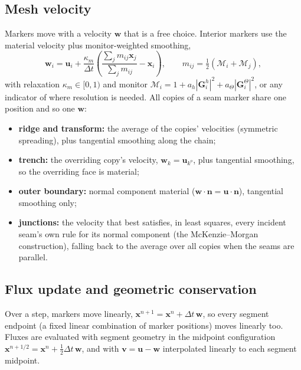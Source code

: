 \documentclass[11pt]{article}
\newcommand{\vect}[1]{\mathbf{#1}}
\begin{document}
\subsection{Mesh velocity}
Markers move with a velocity $\vect{w}$ that is a free choice. Interior markers use the material velocity plus monitor-weighted smoothing,
\begin{equation}
  \vect{w}_i=\vect{u}_i+\frac{\kappa_m}{\Delta t}\left(\frac{\sum_jm_{ij}\vect{x}_j}{\sum_jm_{ij}}-\vect{x}_i\right),\qquad m_{ij}=\tfrac12(\mathcal{M}_i+\mathcal{M}_j),
  \label{eq:meshvel}
\end{equation}
with relaxation $\kappa_m\in[0,1)$ and monitor $\mathcal{M}_i=1+a_h|\vect{G}^h_i|^2+a_\Theta|\vect{G}^\Theta_i|^2$, or any indicator of where resolution is needed. All copies of a seam marker share one position and so one $\vect{w}$:
\begin{itemize}
\item \textbf{ridge and transform:} the average of the copies' velocities (symmetric spreading), plus tangential smoothing along the chain;
\item \textbf{trench:} the overriding copy's velocity, $\vect{w}_k=\vect{u}_{k^o}$, plus tangential smoothing, so the overriding face is material;
\item \textbf{outer boundary:} normal component material ($\vect{w}\cdot\vect{n}=\vect{u}\cdot\vect{n}$), tangential smoothing only;
\item \textbf{junctions:} the velocity that best satisfies, in least squares, every incident seam's own rule for its normal component (the McKenzie--Morgan construction), falling back to the average over all copies when the seams are parallel.
\end{itemize}

\subsection{Flux update and geometric conservation}
Over a step, markers move linearly, $\vect{x}^{n+1}=\vect{x}^n+\Delta t\,\vect{w}$, so every segment endpoint (a fixed linear combination of marker positions) moves linearly too. Fluxes are evaluated with segment geometry in the midpoint configuration $\vect{x}^{n+1/2}=\vect{x}^n+\tfrac12\Delta t\,\vect{w}$, and with $\vect{v}=\vect{u}-\vect{w}$ interpolated linearly to each segment midpoint.
\end{document}
